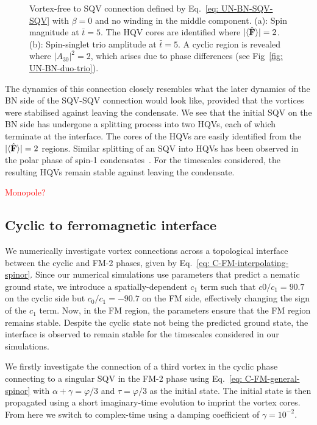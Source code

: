 \begin{figure}
\begin{subfigure}{0.45\textwidth}
        \caption{}
    \end{subfigure}
    \caption[Dynamics of a singly quantised vortex to vortex-free connection in
    a uniaxial nematic to biaxial nematic interface]
    {\label{fig: UN-BN-VF-SQV} Vortex-free to SQV connection defined
    by Eq.~\eqref{eq: UN-BN-SQV-SQV} with \(\beta=0\) and no winding in the
    middle component.
    (a): Spin magnitude at \(\bar{t}=5\). The HQV cores are identified where
    \(|\langle \hat{\vb{F}} \rangle | = 2\).
    (b): Spin-singlet trio amplitude at \(\bar{t} = 5\). A cyclic region is
    revealed where \(|A_{30}|^2 = 2\), which arises due to phase differences
    (see Fig~\ref{fig: UN-BN-duo-trio}).}
\end{figure}
The dynamics of this connection closely resembles what the later dynamics of the
BN side of the SQV-SQV connection would look like, provided that the vortices
were stabilised against leaving the condensate.
We see that the initial SQV on the BN side has undergone a splitting process
into two HQVs, each of which terminate at the interface.
The cores of the HQVs are easily identified from the
\(|\langle \hat{\vb{F}} \rangle | = 2\) regions.
Similar splitting of an SQV into HQVs has been observed in the polar phase of
spin-1 condensates~\cite{Seo2015, Xiao2021}.
For the timescales considered, the resulting HQVs remain stable against
leaving the condensate.

\textcolor{red}{Monopole?}

\subsection{Cyclic to ferromagnetic interface}
We numerically investigate vortex connections across a topological interface
between the cyclic and FM-2 phases, given by
Eq.~\eqref{eq: C-FM-interpolating-spinor}.
Since our numerical simulations use parameters that predict a nematic ground
state, we introduce a spatially-dependent \(c_1\) term such that \(c0/c_1=90.7\)
on the cyclic side but \(c_0/c_1=-90.7\) on the FM side, effectively changing
the sign of the \(c_1\) term.
Now, in the FM region, the parameters ensure that the FM region remains stable.
Despite the cyclic state not being the predicted ground state, the interface
is observed to remain stable for the timescales considered in our simulations.

We firstly investigate the connection of a third vortex in the cyclic phase
connecting to a singular SQV in the FM-2 phase using
Eq.~\eqref{eq: C-FM-general-spinor} with \(\alpha + \gamma = \varphi/3\) and
\(\tau=\varphi/3\) as the initial state.
The initial state is then propagated using a short imaginary-time evolution to
imprint the vortex cores.
From here we switch to complex-time using a damping coefficient of
\(\gamma=10^{-2}\).

